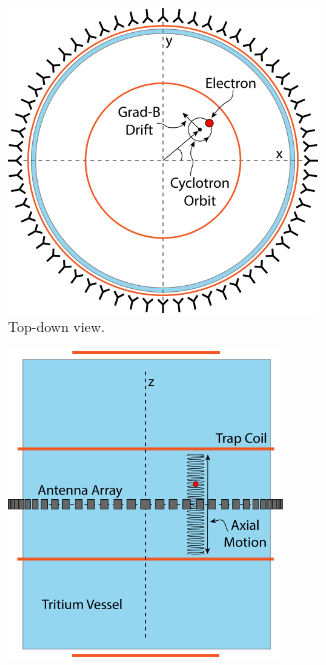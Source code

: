 \begin{figure}[h]
    \centering
    \begin{subfigure}{0.48\textwidth}
        \centering
        \includegraphics[width=0.9\textwidth]{figs/Chapter-4/230328_deepfilter_paper_apparatus_concept_top_v2.png}
        \caption{Top-down view.}
        \label{fig:apparatus_concept_top}
    \end{subfigure}
    \begin{subfigure}{0.48\textwidth}
        \centering
        \includegraphics[width=0.8\textwidth]{figs/Chapter-4/230328_deepfilter_paper_apparatus_concept_side_v2.png}

\end{subfigure}
\end{figure}
